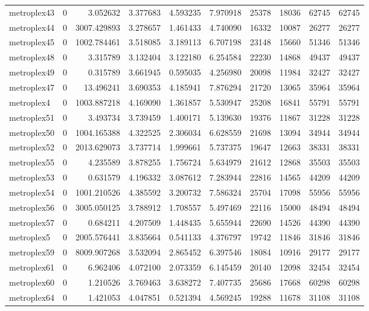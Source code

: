 \begin{longtable}{|l|r|r|r|r|r|r|r|r|r|}
metroplex43 & 0 & 3.052632 & 3.377683 & 4.593235 & 7.970918 & 25378 & 18036 & 62745 & 62745 \\
metroplex44 & 0 & 3007.429893 & 3.278657 & 1.461433 & 4.740090 & 16332 & 10087 & 26277 & 26277 \\
metroplex45 & 0 & 1002.784461 & 3.518085 & 3.189113 & 6.707198 & 23148 & 15660 & 51346 & 51346 \\
metroplex48 & 0 & 3.315789 & 3.132404 & 3.122180 & 6.254584 & 22230 & 14868 & 49437 & 49437 \\
metroplex49 & 0 & 0.315789 & 3.661945 & 0.595035 & 4.256980 & 20098 & 11984 & 32427 & 32427 \\
metroplex47 & 0 & 13.496241 & 3.690353 & 4.185941 & 7.876294 & 21720 & 13065 & 35964 & 35964 \\
metroplex4 & 0 & 1003.887218 & 4.169090 & 1.361857 & 5.530947 & 25208 & 16841 & 55791 & 55791 \\
metroplex51 & 0 & 3.493734 & 3.739459 & 1.400171 & 5.139630 & 19376 & 11867 & 31228 & 31228 \\
metroplex50 & 0 & 1004.165388 & 4.322525 & 2.306034 & 6.628559 & 21698 & 13094 & 34944 & 34944 \\
metroplex52 & 0 & 2013.629073 & 3.737714 & 1.999661 & 5.737375 & 19647 & 12663 & 38331 & 38331 \\
metroplex55 & 0 & 4.235589 & 3.878255 & 1.756724 & 5.634979 & 21612 & 12868 & 35503 & 35503 \\
metroplex53 & 0 & 0.631579 & 4.196332 & 3.087612 & 7.283944 & 22816 & 14565 & 44209 & 44209 \\
metroplex54 & 0 & 1001.210526 & 4.385592 & 3.200732 & 7.586324 & 25704 & 17098 & 55956 & 55956 \\
metroplex56 & 0 & 3005.050125 & 3.788912 & 1.708557 & 5.497469 & 22116 & 15000 & 48494 & 48494 \\
metroplex57 & 0 & 0.684211 & 4.207509 & 1.448435 & 5.655944 & 22690 & 14526 & 44390 & 44390 \\
metroplex5 & 0 & 2005.576441 & 3.835664 & 0.541133 & 4.376797 & 19742 & 11846 & 31846 & 31846 \\
metroplex59 & 0 & 8009.907268 & 3.532094 & 2.865452 & 6.397546 & 18084 & 10916 & 29177 & 29177 \\
metroplex61 & 0 & 6.962406 & 4.072100 & 2.073359 & 6.145459 & 20140 & 12098 & 32454 & 32454 \\
metroplex60 & 0 & 1.210526 & 3.769463 & 3.638272 & 7.407735 & 25686 & 17668 & 60298 & 60298 \\
metroplex64 & 0 & 1.421053 & 4.047851 & 0.521394 & 4.569245 & 19288 & 11678 & 31108 & 31108 \\

\end{longtable}
